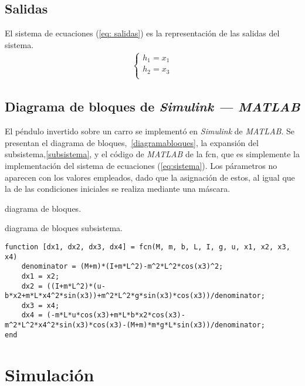 \documentclass{ieeeaccess}
\begin{document}
\subsection{Salidas}

El sistema de ecuaciones (\ref{eq: salidas}) es la representación de las salidas
del sistema.
\begin{eqnarray}
  \label{eq: salidas}
  \left\{
  \begin{array}{ll}
    h_1=x_1\\
    h_2=x_3\\
  \end{array}
  \right.
\end{eqnarray}

\subsection{Diagrama de bloques de \textit{Simulink --- MATLAB}}

El péndulo invertido sobre un carro se implementó en \textit{Simulink} de
\textit{MATLAB}. Se presentan el diagrama de bloques,~\ref{diagramabloques},
la expansión del subsistema,\ref{subsistema}, y el código de \textit{MATLAB} de
la fcn, que es simplemente la implementación del sistema de ecuaciones
(\ref{eq:sistema}). Los párametros no aparecen con los valores empleados,
dado que la asignación de estos, al igual que la de las condiciones iniciales
se realiza mediante una máscara.


{diagrama de bloques.\label{diagramabloques}}

{diagrama de bloques subsistema.\label{subsistema}}

\lstset{language=Matlab, breaklines=true, basicstyle=\footnotesize}
\lstset{numbers=left, numberstyle=\tiny, stepnumber=1, numbersep=-2pt}
\begin{lstlisting}[frame=single]
function [dx1, dx2, dx3, dx4] = fcn(M, m, b, L, I, g, u, x1, x2, x3, x4)
    denominator = (M+m)*(I+m*L^2)-m^2*L^2*cos(x3)^2;
    dx1 = x2;
    dx2 = ((I+m*L^2)*(u-b*x2+m*L*x4^2*sin(x3))+m^2*L^2*g*sin(x3)*cos(x3))/denominator;
    dx3 = x4;
    dx4 = (-m*L*u*cos(x3)+m*L*b*x2*cos(x3)-m^2*L^2*x4^2*sin(x3)*cos(x3)-(M+m)*m*g*L*sin(x3))/denominator;
end
\end{lstlisting}

\section{Simulación}
\end{document}
